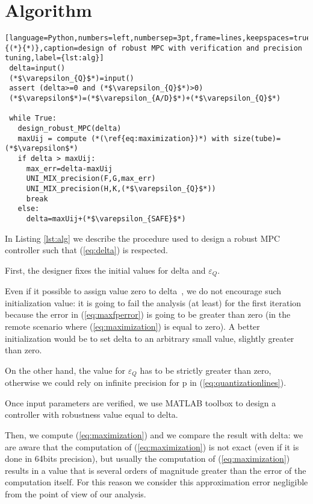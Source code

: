 \documentclass[sigconf]{acmart}
\begin{document}
\section{Algorithm}

\begin{lstlisting}[language=Python,numbers=left,numbersep=3pt,frame=lines,keepspaces=true,escapeinside={(*}{*)},caption=design of robust MPC with verification and precision tuning,label={lst:alg}]
 delta=input()
 (*$\varepsilon_{Q}$*)=input()
 assert (delta>=0 and (*$\varepsilon_{Q}$*)>0)
 (*$\varepsilon$*)=(*$\varepsilon_{A/D}$*)+(*$\varepsilon_{Q}$*)

 while True:
   design_robust_MPC(delta)
   maxUij = compute (*(\ref{eq:maximization})*) with size(tube)=(*$\varepsilon$*)
   if delta > maxUij:
     max_err=delta-maxUij
     UNI_MIX_precision(F,G,max_err)
     UNI_MIX_precision(H,K,(*$\varepsilon_{Q}$*))
     break
   else:
     delta=maxUij+(*$\varepsilon_{SAFE}$*)
\end{lstlisting}
In Listing \ref{lst:alg} we describe the procedure used to design a robust MPC controller such that (\ref{eq:delta}) is respected.

First, the designer fixes the initial values for delta and $\varepsilon_{Q}$.

Even if it possible to assign value zero to delta~\cite{imperialrmpc}, we do not encourage such initialization value: it is going to fail the analysis (at least) for the first iteration because the error in (\ref{eq:maxfperror}) is going to be greater than zero (in the remote scenario where  (\ref{eq:maximization}) is equal to zero). A better initialization would be to set delta to an arbitrary small value, slightly greater than zero.

On the other hand, the value for $\varepsilon_{Q}$ has to be strictly greater than zero, otherwise we could rely on infinite precision for p in (\ref{eq:quantizationlines}).

Once input parameters are verified, we use MATLAB toolbox to design a controller with robustness value equal to delta. 

Then, we compute (\ref{eq:maximization}) and we compare the result with delta: we are aware that the computation of (\ref{eq:maximization}) is not exact (even if it is done in 64bits precision), but usually the computation of (\ref{eq:maximization}) results in a value that is several orders of magnitude greater than the error of the computation itself. For this reason we consider this approximation error negligible from the point of view of our analysis. 
\end{document}
